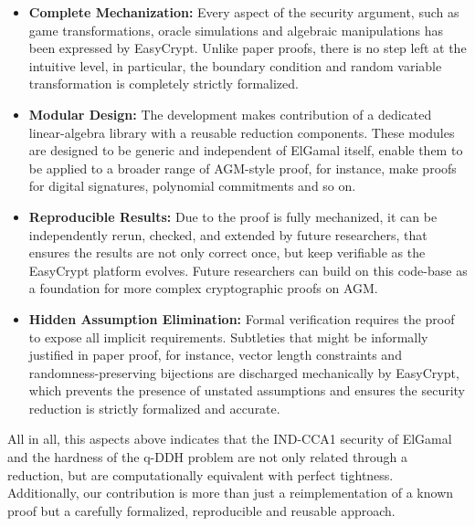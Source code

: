 \begin{itemize}
\item \textbf{Complete Mechanization:} Every aspect of the security argument, such as game transformations, oracle simulations and algebraic manipulations has been expressed by EasyCrypt. Unlike paper proofs, there is no step left at the intuitive level, in particular, the boundary condition and random variable transformation is completely strictly formalized.





\item \textbf{Modular Design:} 
The development makes contribution of  a dedicated linear-algebra library with a reusable reduction components. These modules are  designed to be generic and independent of ElGamal itself, enable them to be applied to a broader range of AGM-style proof, for instance, make proofs for digital signatures, polynomial commitments and so on.


\item \textbf{Reproducible Results:}  Due to the proof is fully mechanized, it can be independently rerun, checked, and extended by future researchers, that ensures the results are not only correct once,  but keep verifiable as the EasyCrypt platform evolves. Future researchers can build on this code-base as a foundation for more complex cryptographic proofs on AGM.








\item \textbf{Hidden Assumption Elimination:} Formal verification requires the proof to expose all implicit requirements. Subtleties that might be informally justified in paper proof, for instance, vector length constraints and randomness-preserving bijections are  discharged mechanically by EasyCrypt, which prevents the presence of unstated assumptions and ensures the security reduction is strictly formalized and accurate.




\end{itemize}

All in all, this aspects above indicates that the IND-CCA1 security of ElGamal and the hardness of the q-DDH problem are not only related through a reduction, but are computationally equivalent with perfect tightness. Additionally, our contribution is more than just a reimplementation of a known proof but a carefully formalized, reproducible and reusable approach.

